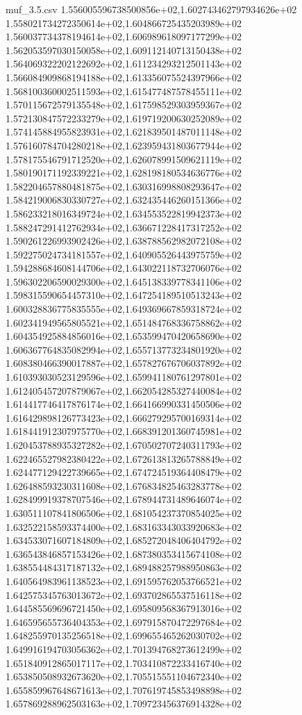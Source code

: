 \begin{filecontents*}{muf_3.5.csv}
1.556005596738500856e+02,1.602743462797934626e+02
1.558021734272350614e+02,1.604866725435203989e+02
1.560037734378194614e+02,1.606989618097177299e+02
1.562053597030150058e+02,1.609112140713150438e+02
1.564069322202122692e+02,1.611234293212501143e+02
1.566084909868194188e+02,1.613356075524397966e+02
1.568100360002511593e+02,1.615477487578455111e+02
1.570115672579135548e+02,1.617598529303959367e+02
1.572130847572233279e+02,1.619719200630252089e+02
1.574145884955823931e+02,1.621839501487011148e+02
1.576160784704280218e+02,1.623959431803677944e+02
1.578175546791712520e+02,1.626078991509621119e+02
1.580190171192339221e+02,1.628198180534636776e+02
1.582204657880481875e+02,1.630316998808293647e+02
1.584219006830330727e+02,1.632435446260151366e+02
1.586233218016349724e+02,1.634553522819942373e+02
1.588247291412762934e+02,1.636671228417317252e+02
1.590261226993902426e+02,1.638788562982072108e+02
1.592275024734181557e+02,1.640905526443975759e+02
1.594288684608144706e+02,1.643022118732706076e+02
1.596302206590029300e+02,1.645138339778341106e+02
1.598315590654457310e+02,1.647254189510513243e+02
1.600328836775835555e+02,1.649369667859318724e+02
1.602341949565805521e+02,1.651484768336758862e+02
1.604354925884856016e+02,1.653599470420658690e+02
1.606367764835082994e+02,1.655713773234801920e+02
1.608380466390017887e+02,1.657827676706037892e+02
1.610393030523129596e+02,1.659941180761297801e+02
1.612405457207879067e+02,1.662054285327440084e+02
1.614417746417876174e+02,1.664166990331450506e+02
1.616429898126773423e+02,1.666279295700169314e+02
1.618441912307975770e+02,1.668391201360745981e+02
1.620453788935327282e+02,1.670502707240311793e+02
1.622465527982380422e+02,1.672613813265788849e+02
1.624477129422739665e+02,1.674724519364408479e+02
1.626488593230311608e+02,1.676834825463283778e+02
1.628499919378707546e+02,1.678944731489646074e+02
1.630511107841806506e+02,1.681054237370854025e+02
1.632522158593374400e+02,1.683163343033920683e+02
1.634533071607184809e+02,1.685272048406404792e+02
1.636543846857153426e+02,1.687380353415674108e+02
1.638554484317187132e+02,1.689488257988950863e+02
1.640564983961138523e+02,1.691595762053766521e+02
1.642575345763013672e+02,1.693702865537516118e+02
1.644585569696721450e+02,1.695809568367913016e+02
1.646595655736404353e+02,1.697915870472297684e+02
1.648255970135256518e+02,1.699655465262030702e+02
1.649916194703056362e+02,1.701394768273612499e+02
1.651840912865017117e+02,1.703410872233416740e+02
1.653850508932673620e+02,1.705515551104672340e+02
1.655859967648671613e+02,1.707619745853498898e+02
1.657869288962503163e+02,1.709723456376914328e+02

\end{filecontents*}
